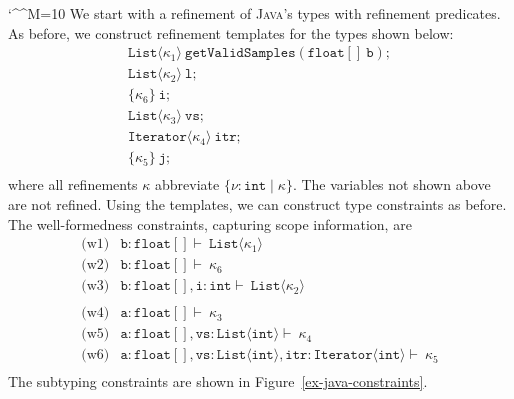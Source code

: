 \documentclass[nocopyrightspace]{sigplanconf}
\makeatletter
\def\set#1{{\{ #1\}}}
\def\tuple#1{{\langle #1 \rangle}}
\newcommand\Java{\textsc{Java}\xspace}
\newcommand{\ttitr}{\mathtt{itr}}
\newcommand{\ttvs}{\mathtt{vs}}
\newcommand{\ttgetValidSamples}{\mathtt{getValidSamples}}
\newcommand{\ttb}{\mathtt{b}}
\newcommand{\tta}{\mathtt{a}}
\newcommand{\tti}{\mathtt{i}}
\newcommand{\ttj}{\mathtt{j}}
\newcommand{\ttList}{\mathtt{List}}
\newcommand{\ttjiter}{\mathtt{Iterator}}
\def\ttl{\mathtt{l}}
\def\@comment{\let\do\@makeother \dospecials\catcode`\^^M=10\def\par{}}
\def\begincomment{\@comment\@xcomment}
\newenvironment{comment}{\begincomment}{}
\def\valu{\nu}
\newcommand{\ftyp}[2]{{{#1}\!:\!{#2}}}
\newcommand{\ttfarray}{\xspace \mathtt{float[]}}
\newcommand{\kvar}{\kappa}
\def\ttint{\mathtt{int}}
\newcommand{\reftyp}[3]{\set{\ftyp{{#1}}{{#2}} \mid {#3}}}
\newcommand{\sreftyp}[1]{\set{{#1}}}
\newcommand{\deriv}{\vdash\ }
\makeatother
\begin{document}
\begin{comment}
We start with a refinement of \Java's types with refinement predicates.
As before, we construct refinement templates for the types
shown below:$$\begin{array}{l} 
\ttList\tuple{\kvar_1}\ \ttgetValidSamples(\ttfarray\ \ttb);\\
\ttList\tuple{\kvar_2}\ \ttl;\\
\sreftyp{\kvar_6}\ \tti;\\
\ttList\tuple{\kvar_3}\ \ttvs;\\
\ttjiter\tuple{\kvar_4}\ \ttitr;\\
\sreftyp{\kvar_5}\ \ttj;\\
\end{array}$$
where all refinements $\kvar$ abbreviate $\reftyp{\valu}{\ttint}{\kvar}$.
The variables not shown above are not refined.
Using the templates, we can construct type constraints as before.
The well-formedness constraints, capturing scope information, are
\[
\begin{array}{cl}
	\mbox{(w1)}  & \ftyp{\ttb}{\ttfarray} \deriv \ttList\tuple{\kvar_1}\\
	\mbox{(w2)}  & \ftyp{\ttb}{\ttfarray} \deriv \kvar_6\\
	\mbox{(w3)}  & \ftyp{\ttb}{\ttfarray}, \ftyp{\tti}{\ttint} \deriv \ttList\tuple{\kvar_2} \\
\\
	\mbox{(w4)}  & \ftyp{\tta}{\ttfarray} \deriv \kvar_3\\
	\mbox{(w5)}  & \ftyp{\tta}{\ttfarray}, \ftyp{\ttvs}{\ttList\tuple{\ttint}} \deriv \kvar_4\\
	\mbox{(w6)}  & \ftyp{\tta}{\ttfarray},
	\ftyp{\ttvs}{\ttList\tuple{\ttint}},\ftyp{\ttitr}{\ttjiter\tuple{\ttint}} \deriv \kvar_5\\
\end{array}
\]
The subtyping constraints are shown in Figure~\ref{ex-java-constraints}.


\end{comment}
\end{document}
